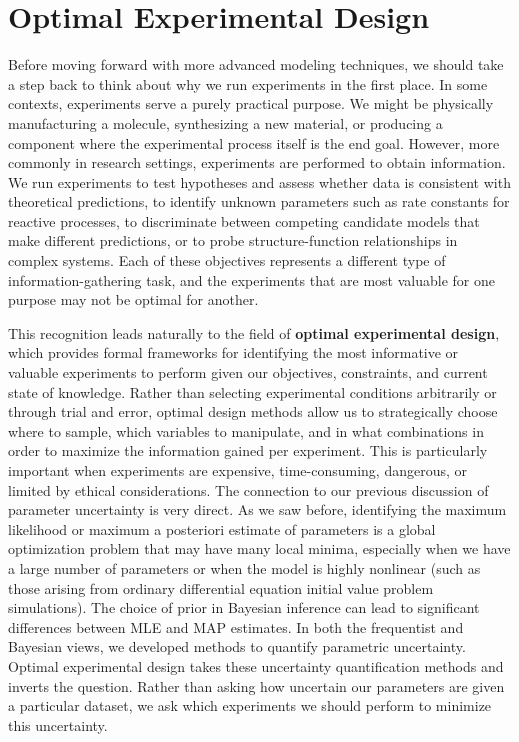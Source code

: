 \section{Optimal Experimental Design}

Before moving forward with more advanced modeling techniques, we should take a step back to think about why we run experiments in the first place. In some contexts, experiments serve a purely practical purpose. We might be physically manufacturing a molecule, synthesizing a new material, or producing a component where the experimental process itself is the end goal. However, more commonly in research settings, experiments are performed to obtain information. We run experiments to test hypotheses and assess whether data is consistent with theoretical predictions, to identify unknown parameters such as rate constants for reactive processes, to discriminate between competing candidate models that make different predictions, or to probe structure-function relationships in complex systems. Each of these objectives represents a different type of information-gathering task, and the experiments that are most valuable for one purpose may not be optimal for another.

This recognition leads naturally to the field of \textbf{optimal experimental design}, which provides formal frameworks for identifying the most informative or valuable experiments to perform given our objectives, constraints, and current state of knowledge. Rather than selecting experimental conditions arbitrarily or through trial and error, optimal design methods allow us to strategically choose where to sample, which variables to manipulate, and in what combinations in order to maximize the information gained per experiment. This is particularly important when experiments are expensive, time-consuming, dangerous, or limited by ethical considerations. The connection to our previous discussion of parameter uncertainty is very direct. As we saw before, identifying the maximum likelihood or maximum a posteriori estimate of parameters is a global optimization problem that may have many local minima, especially when we have a large number of parameters or when the model is highly nonlinear (such as those arising from ordinary differential equation initial value problem simulations). The choice of prior in Bayesian inference can lead to significant differences between MLE and MAP estimates. In both the frequentist and Bayesian views, we developed methods to quantify parametric uncertainty. Optimal experimental design takes these uncertainty quantification methods and inverts the question. Rather than asking how uncertain our parameters are given a particular dataset, we ask which experiments we should perform to minimize this uncertainty. 

